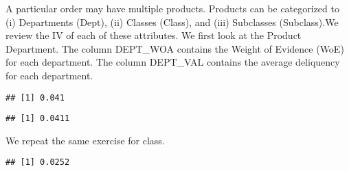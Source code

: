 \documentclass[
]{article}
\newenvironment{Shaded}{\begin{snugshade}}{\end{snugshade}}
\newcommand{\DataTypeTok}[1]{\textcolor[rgb]{0.13,0.29,0.53}{#1}}
\newcommand{\KeywordTok}[1]{\textcolor[rgb]{0.13,0.29,0.53}{\textbf{#1}}}
\newcommand{\NormalTok}[1]{#1}
\newcommand{\OperatorTok}[1]{\textcolor[rgb]{0.81,0.36,0.00}{\textbf{#1}}}
\newcommand{\StringTok}[1]{\textcolor[rgb]{0.31,0.60,0.02}{#1}}
\begin{document}
A particular order may have multiple products. Products can be
categorized to (i) Departments (Dept), (ii) Classes (Class), and (iii)
Subclasses (Subclass).We review the IV of each of these attributes. We
first look at the Product Department. The column DEPT\_WOA contains the
Weight of Evidence (WoE) for each department. The column DEPT\_VAL
contains the average deliquency for each department.

\begin{Shaded}
\end{Shaded}

\begin{verbatim}
## [1] 0.041
\end{verbatim}

\begin{Shaded}
\end{Shaded}

\begin{verbatim}
## [1] 0.0411
\end{verbatim}

We repeat the same exercise for class.

\begin{Shaded}
\end{Shaded}

\begin{verbatim}
## [1] 0.0252
\end{verbatim}

\begin{Shaded}
\end{Shaded}
\end{document}
